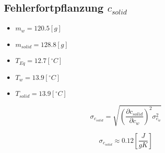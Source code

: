 \documentclass[10pt,a4paper]{article}
\begin{document}
\subsection{Fehlerfortpflanzung $c_{solid}$}

\begin{itemize}
    \item $m_w = 120.5 [g]$
    \item $m_{solid} = 128.8 [g]$
    \item $T_{Eq} = 12.7 [^{\circ} C]$
    \item $T_w = 13.9 [^{\circ} C]$
    \item $T_{solid} = 13.9 [^{\circ} C]$
\end{itemize}

\begin{equation}
    \sigma_{c_{solid}} = \sqrt{ \left(\frac{\partial c_{solid}}{\partial c_w}\right)^2 \sigma_{c_w}^2}
\end{equation}

\begin{equation}
    \sigma_{c_{solid}} \approx 0.12 \left[\frac{J}{g K}\right]
\end{equation}

\centerline{}


\end{document}

